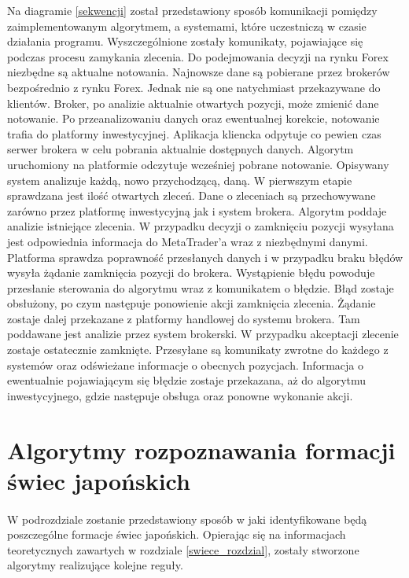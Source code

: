 \documentclass[pdflatex,11pt]{aghdpl}
\begin{document}
Na diagramie \ref{sekwencji} został przedstawiony sposób komunikacji pomiędzy zaimplementowanym algorytmem, a systemami, które uczestniczą w czasie działania programu. Wyszczególnione zostały komunikaty, pojawiające się podczas procesu zamykania zlecenia. Do podejmowania decyzji na rynku Forex niezbędne są aktualne notowania. Najnowsze dane są pobierane przez brokerów bezpośrednio z rynku Forex. Jednak nie są one natychmiast przekazywane do klientów. Broker, po analizie aktualnie otwartych pozycji, może zmienić dane notowanie. Po przeanalizowaniu danych oraz ewentualnej korekcie, notowanie trafia do platformy inwestycyjnej. Aplikacja kliencka odpytuje co pewien czas serwer brokera w celu pobrania aktualnie dostępnych danych. Algorytm uruchomiony na platformie odczytuje wcześniej pobrane notowanie. Opisywany system analizuje każdą, nowo przychodzącą, daną. W pierwszym etapie sprawdzana jest ilość otwartych zleceń. Dane o zleceniach są przechowywane zarówno przez platformę inwestycyjną jak i system brokera. Algorytm poddaje analizie istniejące zlecenia. W przypadku decyzji o zamknięciu pozycji wysyłana jest odpowiednia informacja do MetaTrader'a wraz z niezbędnymi danymi. Platforma sprawdza poprawność przesłanych danych i w przypadku braku błędów wysyła żądanie zamknięcia pozycji do brokera. Wystąpienie błędu powoduje przesłanie sterowania do algorytmu wraz z komunikatem o błędzie. Błąd zostaje obsłużony, po czym następuje ponowienie akcji zamknięcia zlecenia. Żądanie zostaje dalej przekazane z platformy handlowej do systemu brokera. Tam poddawane jest analizie przez system brokerski. W przypadku akceptacji zlecenie zostaje ostatecznie zamknięte. Przesyłane są komunikaty zwrotne do każdego z systemów oraz odświeżane informacje o obecnych pozycjach. Informacja o ewentualnie pojawiającym się błędzie zostaje przekazana, aż do algorytmu inwestycyjnego, gdzie następuje obsługa oraz ponowne wykonanie akcji.

\section{Algorytmy rozpoznawania formacji świec japońskich}
\paragraph{}

W podrozdziale zostanie przedstawiony sposób w jaki identyfikowane będą poszczególne formacje świec japońskich. Opierając się na informacjach teoretycznych zawartych w rozdziale \ref{swiece_rozdzial}, zostały stworzone algorytmy realizujące kolejne reguły. 
\end{document}
